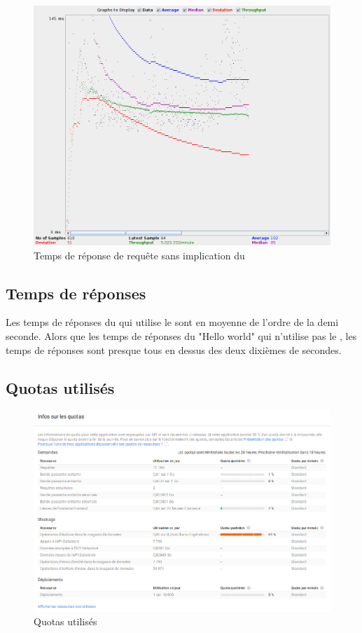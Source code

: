 \documentclass[french]{msereport}
\begin{document}
			\begin{figure}[h]
				\label{perf_helloworld}
				\centering
				\includegraphics[width=\textwidth]{screen_jmeter_helloworld.png}
				\caption{Temps de réponse de requête sans implication du }
			\end{figure}
				
		\subsection{Temps de réponses}
			Les temps de réponses du  qui utilise le  sont en moyenne de l'ordre de la demi seconde. Alors que les temps de réponses du  "Hello world" qui n'utilise pas le , les temps de réponses sont presque tous en dessus des deux dixièmes de secondes.
			
		\subsection{Quotas utilisés}
			\begin{figure}[h]
				\label{quotas}
				\centering
				\includegraphics[width=\textwidth]{screen_quotas.png}
				\caption{Quotas utilisés}
			\end{figure}

	\appendixsection
		
		\listoffigures
		
\end{document}
